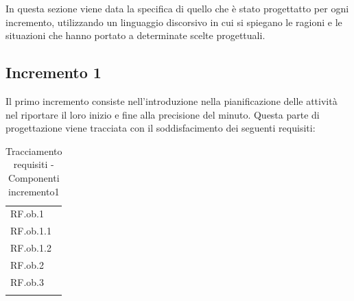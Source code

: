 In questa sezione viene data la specifica di quello che \`{e} stato progettatto per ogni incremento, utilizzando un linguaggio discorsivo in cui si spiegano le ragioni e le situazioni che hanno portato a determinate scelte progettuali.
\subsection{Incremento 1}
Il primo incremento consiste nell\textquoteright{}introduzione nella pianificazione delle attivit\`{a} nel riportare il loro inizio e fine alla precisione del minuto. Questa parte di progettazione viene tracciata con il soddisfacimento dei seguenti requisiti:

\begin{longtable}{|>{\centering}p{3cm}|}
    \hline
    \multicolumn{1}{|c|}{\textbf{Requisiti}} \\ %
      \hline
        RF.ob.1 \tabularnewline \hline
		RF.ob.1.1 \tabularnewline \hline
		RF.ob.1.2 \tabularnewline \hline
		RF.ob.2 \tabularnewline \hline
		RF.ob.3 \tabularnewline \hline
    \caption{Tracciamento requisiti - Componenti incremento1}
    \label{tab:Tracciamento requisiti - Componenti incremento1}
\end{longtable}

